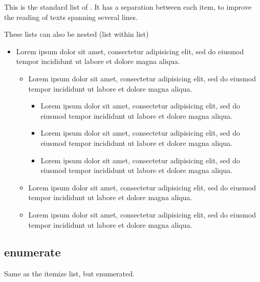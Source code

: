 This is the standard list of \latex{}. It has a separation between each item, to improve the reading of texts spanning several lines.

%
These lists can also be nested (list within list)

\begin{filecontents*}{\democodefile}
\begin{itemize}
   \item Lorem ipsum dolor sit amet, consectetur adipisicing elit, sed do
   eiusmod tempor incididunt ut labore et dolore magna aliqua.
   \begin{itemize}
      \item Lorem ipsum dolor sit amet, consectetur adipisicing elit, sed do
      eiusmod tempor incididunt ut labore et dolore magna aliqua.
      \begin{itemize}
         \item Lorem ipsum dolor sit amet, consectetur adipisicing elit, sed
         do eiusmod tempor incididunt ut labore et dolore magna aliqua.
         \item Lorem ipsum dolor sit amet, consectetur adipisicing elit, sed
         do eiusmod tempor incididunt ut labore et dolore magna aliqua.
         \item Lorem ipsum dolor sit amet, consectetur adipisicing elit, sed
         do eiusmod tempor incididunt ut labore et dolore magna aliqua.
      \end{itemize}
      \item Lorem ipsum dolor sit amet, consectetur adipisicing elit, sed do
      eiusmod tempor incididunt ut labore et dolore magna aliqua.
      \item Lorem ipsum dolor sit amet, consectetur adipisicing elit, sed do
      eiusmod tempor incididunt ut labore et dolore magna aliqua.
   \end{itemize}
\end{itemize}
\end{filecontents*}


\subsection{enumerate}

Same as the itemize list, but enumerated.

